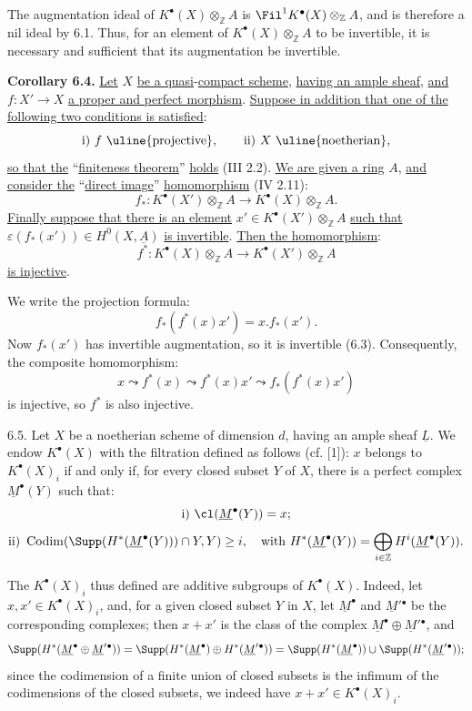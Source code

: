 The augmentation ideal of $K^{\bullet}(X)\otimes_{\mathbb Z}A$ is $\Fil^1K^{\bullet}(X)\otimes_{\mathbb Z}A$, and is therefore a nil ideal by 6.1. Thus, for an element of $K^{\bullet}(X)\otimes_{\mathbb Z}A$ to be invertible, it is necessary and sufficient that its augmentation be invertible.

\textbf{Corollary 6.4.} \uline{Let} $X$ \uline{be a quasi}-\uline{compact scheme}, \uline{having an ample sheaf}, \uline{and} $f:X'\to X$ \uline{a proper and perfect morphism}. \uline{Suppose in addition that one of the following two conditions is satisfied}:
\[
  \text{i) } f\text{ \uline{projective}},\qquad
  \text{ii) } X\text{ \uline{noetherian}},
\]
\uline{so that the} ``\uline{finiteness theorem}'' \uline{holds} (III 2.2). \uline{We are given a ring} $A$, \uline{and} \uline{consider the} ``\uline{direct image}'' \uline{homomorphism} (IV 2.11):
\[
  f_*:K^{\bullet}(X')\otimes_{\mathbb Z}A\longrightarrow K^{\bullet}(X)\otimes_{\mathbb Z}A.
\]
\uline{Finally suppose that there is an element} $x'\in K^{\bullet}(X')\otimes_{\mathbb Z}A$ \uline{such that} $\varepsilon(f_*(x'))\in H^0(X,\underline{A})$ \uline{is invertible}. \uline{Then the homomorphism}:
\[
  f^*:K^{\bullet}(X)\otimes_{\mathbb Z}A\longrightarrow K^{\bullet}(X')\otimes_{\mathbb Z}A
\]
\uline{is injective}.

We write the projection formula:
\[
  f_*(f^*(x)x')=x.f_*(x').
\]
Now $f_*(x')$ has invertible augmentation, so it is invertible (6.3). Consequently, the composite homomorphism:
%
\[
  x\leadsto f^*(x)\leadsto f^*(x)x'\leadsto f_*(f^*(x)x')
\]
is injective, so $f^*$ is also injective.

6.5. Let $X$ be a noetherian scheme of dimension $d$, having an ample sheaf $\underline{L}$. We endow $K^{\bullet}(X)$ with the filtration defined as follows (cf. [1]): $x$ belongs to $K^{\bullet}(X)_i$ if and only if, for every closed subset $Y$ of $X$, there is a perfect complex $\underline{M}^\bullet(Y)$ such that:
\[
  \text{i) } \cl(\underline{M}^\bullet(Y))=x;
\]
\[
  \text{ii) } \operatorname{Codim}(\Supp(H^*(\underline{M}^\bullet(Y)))\cap Y,Y)\ge i,
  \quad\text{with } H^*(\underline{M}^\bullet(Y))=\bigoplus_{i\in\mathbb Z}H^i(\underline{M}^\bullet(Y)).
\]

The $K^{\bullet}(X)_i$ thus defined are additive subgroups of $K^{\bullet}(X)$. Indeed, let $x,x'\in K^{\bullet}(X)_i$, and, for a given closed subset $Y$ in $X$, let $\underline{M}^\bullet$ and $\underline{M}'{}^\bullet$ be the corresponding complexes; then $x+x'$ is the class of the complex $\underline{M}^\bullet\oplus \underline{M}'{}^\bullet$, and
\[
\Supp(H^*(\underline{M}^\bullet\oplus \underline{M}'{}^\bullet))
 =\Supp(H^*(\underline{M}^\bullet)\oplus H^*(\underline{M}'{}^\bullet))
 =\Supp(H^*(\underline{M}^\bullet))\cup\Supp(H^*(\underline{M}'{}^\bullet));
\]
since the codimension of a finite union of closed subsets is the infimum of the codimensions of the closed subsets, we indeed have $x+x'\in K^{\bullet}(X)_i$.

